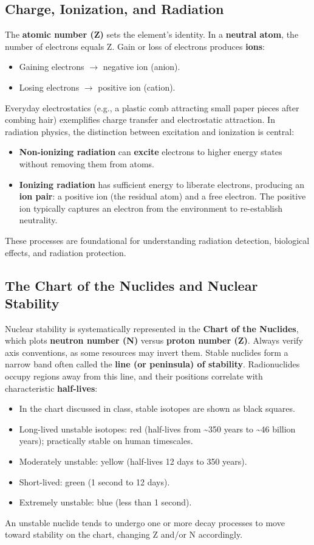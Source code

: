 \documentclass[11pt,a4paper]{article}
\let\originalsubsection\subsection
\renewcommand{\subsection}{\Needspace{8\baselineskip}\originalsubsection}
\begin{document}
\subsection{Charge, Ionization, and Radiation}
The \textbf{atomic number (Z)} sets the element's identity. In a \textbf{neutral atom}, the number of electrons equals Z. Gain or loss of electrons produces \textbf{ions}:

\begin{itemize}
\item Gaining electrons \ensuremath{\rightarrow} negative ion (anion).
\item Losing electrons \ensuremath{\rightarrow} positive ion (cation).
\end{itemize}
Everyday electrostatics (e.g., a plastic comb attracting small paper pieces after combing hair) exemplifies charge transfer and electrostatic attraction. In radiation physics, the distinction between excitation and ionization is central:

\begin{itemize}
\item \textbf{Non-ionizing radiation} can \textbf{excite} electrons to higher energy states without removing them from atoms.
\item \textbf{Ionizing radiation} has sufficient energy to liberate electrons, producing an \textbf{ion pair}: a positive ion (the residual atom) and a free electron. The positive ion typically captures an electron from the environment to re-establish neutrality.
\end{itemize}
These processes are foundational for understanding radiation detection, biological effects, and radiation protection.

\subsection{The Chart of the Nuclides and Nuclear Stability}
Nuclear stability is systematically represented in the \textbf{Chart of the Nuclides}, which plots \textbf{neutron number (N)} versus \textbf{proton number (Z)}. Always verify axis conventions, as some resources may invert them. Stable nuclides form a narrow band often called the \textbf{line (or peninsula) of stability}. Radionuclides occupy regions away from this line, and their positions correlate with characteristic \textbf{half-lives}:

\begin{itemize}
\item In the chart discussed in class, stable isotopes are shown as black squares.
\item Long-lived unstable isotopes: red (half-lives from \textasciitilde{}350 years to \textasciitilde{}46 billion years); practically stable on human timescales.
\item Moderately unstable: yellow (half-lives 12 days to 350 years).
\item Short-lived: green (1 second to 12 days).
\item Extremely unstable: blue (less than 1 second).
\end{itemize}
An unstable nuclide tends to undergo one or more decay processes to move toward stability on the chart, changing Z and/or N accordingly.
\end{document}
